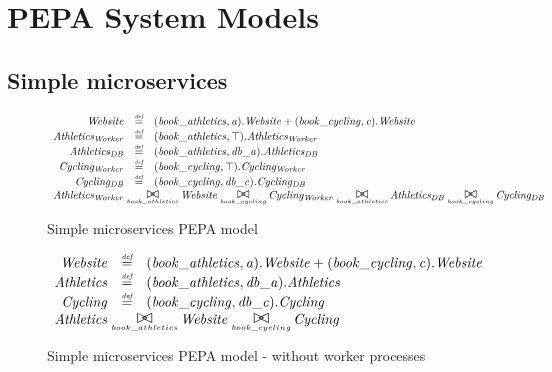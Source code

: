 %
%

\section{PEPA System Models}

%
%
\subsection{Simple microservices}

\begin{figure}
	\caption{Simple microservices PEPA model}
	\centering
\begin{displaymath}
	\begin{array}{rcl}
		\mathit{Website} & \rmdef & (\mathit{book\_athletics},\mathit{a}).\mathit{Website}+(\mathit{book\_cycling},\mathit{c}).\mathit{Website}\\
		\mathit{Athletics_{Worker}} & \rmdef & (\mathit{book\_athletics},\top).\mathit{Athletics_{Worker}}\\
		\mathit{Athletics_{DB}} & \rmdef & (\mathit{book\_athletics},\mathit{db\_a}).\mathit{Athletics_{DB}}\\
		\mathit{Cycling_{Worker}} & \rmdef & (\mathit{book\_cycling},\top).\mathit{Cycling_{Worker}}\\
		\mathit{Cycling_{DB}} & \rmdef & (\mathit{book\_cycling},\mathit{db\_c}).\mathit{Cycling_{DB}}\\
		[0.0ex]		\multicolumn{3}{l}{\mathit{Athletics_{Worker}}\sync{book\_athletics}\mathit{Website}\sync{book\_cycling}\mathit{Cycling_{Worker}}\sync{book\_athletics}\mathit{Athletics_{DB}}\sync{book\_cycling}\mathit{Cycling_{DB}}}\\
		[0.0ex]	\end{array}
\end{displaymath}
\end{figure}

\begin{figure}
	\caption{Simple microservices PEPA model - without worker processes}
	\centering
\begin{displaymath}
\begin{array}{rcl}
		\mathit{Website} & \rmdef & (\mathit{book\_athletics},\mathit{a}).\mathit{Website}+(\mathit{book\_cycling},\mathit{c}).\mathit{Website}\\
\mathit{Athletics} & \rmdef & (\mathit{book\_athletics},\mathit{db\_a}).\mathit{Athletics}\\
\mathit{Cycling} & \rmdef & (\mathit{book\_cycling},\mathit{db\_c}).\mathit{Cycling}\\
[0.0ex]		\multicolumn{3}{l}{\mathit{Athletics}\sync{book\_athletics}\mathit{Website}\sync{book\_cycling}\mathit{Cycling}}\\
[0.0ex]	\end{array}
\end{displaymath}
\end{figure}